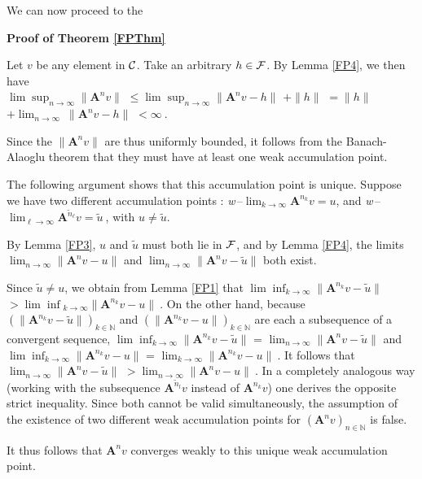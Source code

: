 \documentclass[10pt]{article}
\newcommand{\QED}{\hfill \raisebox{-2pt}{\rule{5.6pt}{8pt}\rule{4pt}{0pt}}%
  \smallskip\par}
\def\N{\mathbb{N}}
\def\A{\mathbf{A}}
\begin{document}
\bigskip

We can now proceed to the

\bigskip

\noindent
{\bf Proof of Theorem \ref{FPThm}}

\noindent
Let $v$ be any element in $\cal{C}$. Take an arbitrary $h \in {\cal F}$.
By Lemma \ref{FP4}, we then have \\
$\lim\sup_{n \to \infty}\| \A ^n v\|$
$ \leq
\lim\sup_{n \to \infty} \|\A ^n v - h\|$
$+\| h\|$
$ = \| h\| $  $+ \lim_{n \to \infty}\ \|\A ^n v - h\|$
$< \infty~$.

\noindent
Since the $\|\A ^n v\|$ are thus uniformly bounded,
it follows from the Banach-Alaoglu theorem that they must have at least
one weak accumulation point.

\noindent
The following argument shows that this
accumulation point is unique.
Suppose we have two different accumulation points :
{\em w}$\,$--$\lim_{k \to \infty}\A ^{n_k} v =u$, and
{\em w}$\,$--$\lim_{\ell \to \infty}\A ^{{\tilde n}_\ell} v =\tilde{u}~$,
with $u \neq {\tilde u}$.

\noindent
By Lemma \ref{FP3}, $u$ and $\tilde u$ must both lie in $\cal F$,
and by Lemma \ref{FP4},
the limits $\lim_{n \to \infty} \|\A ^n v -
u\|$ and $\lim_{n \to \infty} \|\A ^n v -
{\tilde u} \|$ both exist.

\noindent
Since $\tilde{u} \neq u$, we obtain from Lemma \ref{FP1} that
$\lim\inf_{k \to \infty} \|\A ^{n_k} v - {\tilde u}\| $
$ > {\lim\inf}_{k \to \infty} \|\A ^{n_k} v - u\|\ .$
On the other hand,
because $(\|\A ^{n_k} v-{\tilde u}\|)_{k\in \mathbb{N}}$ and
$(\|\A ^{n_k} v-u\|)_{k\in \mathbb{N}}$
are each a
subsequence of a convergent sequence,
$\lim\inf_{k \to \infty} \|\A ^{n_k} v - {\tilde u}\|$ =
$\lim_{n \to \infty} \|\A ^n v - {\tilde u}\|$ and
$\lim\inf_{k \to \infty} \|\A ^{n_k} v - u\|$ =
$ \lim_{k \to \infty} \|\A ^{n_k} v - u\|~$.
It follows that
$\lim_{n \to \infty} \|\A ^{n} v - {\tilde
u}\|$ $> \lim_{n \to \infty} \|\A ^n v -u\| ~$.
In a completely analogous way (working with the subsequence
$\A ^{{\tilde n}_l} v$ instead of $\A ^{n_k} v$) one derives
the opposite strict inequality. Since both cannot be valid
simultaneously, the assumption of the existence of two different
weak accumulation points for $(\A ^n v)_{n\in \N}$ is false.

\noindent
It thus follows that $\A ^n v$ converges weakly to this unique
weak accumulation point.
\hfill\QED

\bigskip
\end{document}
